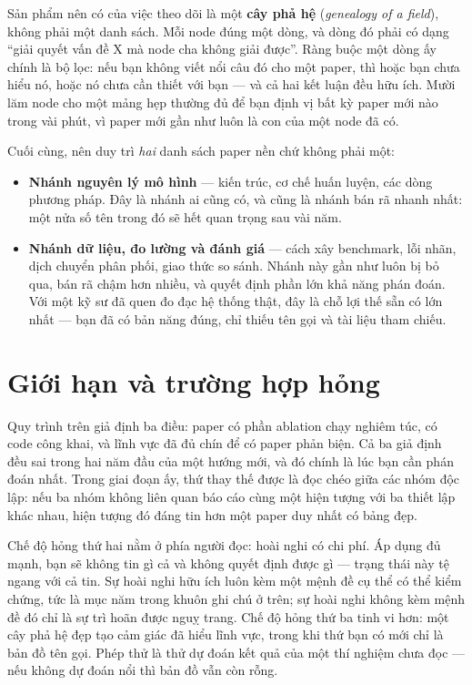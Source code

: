 \documentclass[../../deep_learning.tex]{subfiles}
\begin{document}
Sản phẩm nên có của việc theo dõi là một \textbf{cây phả hệ} (\emph{genealogy of a field}), không phải một danh sách. Mỗi node đúng một dòng, và dòng đó phải có dạng ``giải quyết vấn đề X mà node cha không giải được''. Ràng buộc một dòng ấy chính là bộ lọc: nếu bạn không viết nổi câu đó cho một paper, thì hoặc bạn chưa hiểu nó, hoặc nó chưa cần thiết với bạn — và cả hai kết luận đều hữu ích. Mười lăm node cho một mảng hẹp thường đủ để bạn định vị bất kỳ paper mới nào trong vài phút, vì paper mới gần như luôn là con của một node đã có.

Cuối cùng, nên duy trì \emph{hai} danh sách paper nền chứ không phải một:

\begin{itemize}
\item \textbf{Nhánh nguyên lý mô hình} --- kiến trúc, cơ chế huấn luyện, các dòng phương pháp. Đây là nhánh ai cũng có, và cũng là nhánh bán rã nhanh nhất: một nửa số tên trong đó sẽ hết quan trọng sau vài năm.
\item \textbf{Nhánh dữ liệu, đo lường và đánh giá} --- cách xây benchmark, lỗi nhãn, dịch chuyển phân phối, giao thức so sánh. Nhánh này gần như luôn bị bỏ qua, bán rã chậm hơn nhiều, và quyết định phần lớn khả năng phán đoán. Với một kỹ sư đã quen đo đạc hệ thống thật, đây là chỗ lợi thế sẵn có lớn nhất --- bạn đã có bản năng đúng, chỉ thiếu tên gọi và tài liệu tham chiếu.
\end{itemize}

\section{Giới hạn và trường hợp hỏng}
Quy trình trên giả định ba điều: paper có phần ablation chạy nghiêm túc, có code công khai, và lĩnh vực đã đủ chín để có paper phản biện. Cả ba giả định đều sai trong hai năm đầu của một hướng mới, và đó chính là lúc bạn cần phán đoán nhất. Trong giai đoạn ấy, thứ thay thế được là đọc chéo giữa các nhóm độc lập: nếu ba nhóm không liên quan báo cáo cùng một hiện tượng với ba thiết lập khác nhau, hiện tượng đó đáng tin hơn một paper duy nhất có bảng đẹp.

Chế độ hỏng thứ hai nằm ở phía người đọc: hoài nghi có chi phí. Áp dụng đủ mạnh, bạn sẽ không tin gì cả và không quyết định được gì — trạng thái này tệ ngang với cả tin. Sự hoài nghi hữu ích luôn kèm một mệnh đề cụ thể có thể kiểm chứng, tức là mục năm trong khuôn ghi chú ở trên; sự hoài nghi không kèm mệnh đề đó chỉ là sự trì hoãn được nguỵ trang. Chế độ hỏng thứ ba tinh vi hơn: một cây phả hệ đẹp tạo cảm giác đã hiểu lĩnh vực, trong khi thứ bạn có mới chỉ là bản đồ tên gọi. Phép thử là thử dự đoán kết quả của một thí nghiệm chưa đọc — nếu không dự đoán nổi thì bản đồ vẫn còn rỗng.
\end{document}
